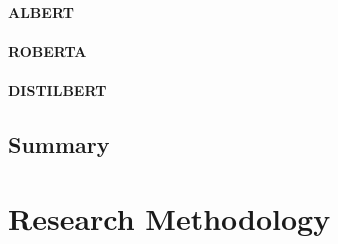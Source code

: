 \documentclass[a4paper,12pt]{report}
\begin{document}
	       \subsubsection{ALBERT}\label{2322}
	       \citep{albert}

	       \subsubsection{ROBERTA}\label{2323}
	       \citep{roberta}

	       \subsubsection{DISTILBERT}\label{2324}
	       \citep{distil}

        \section{Summary}\label{26}


    \chapter{Research Methodology}\label{c3researchmeth}
\end{document}
